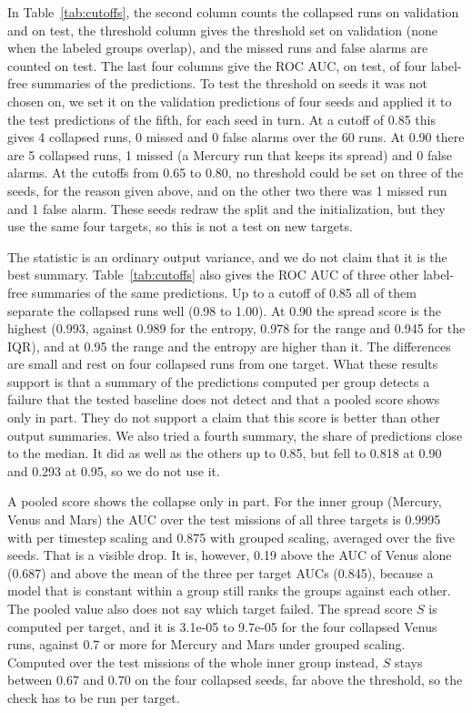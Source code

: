 
In Table~\ref{tab:cutoffs}, the second column counts the collapsed runs on validation and on test, the threshold column gives the threshold set on validation (none when the labeled groups overlap), and the missed runs and false alarms are counted on test. The last four columns give the ROC AUC, on test, of four label-free summaries of the predictions. To test the threshold on seeds it was not chosen on, we set it on the validation predictions of four seeds and applied it to the test predictions of the fifth, for each seed in turn. At a cutoff of 0.85 this gives 4 collapsed runs, 0 missed and 0 false alarms over the 60 runs. At 0.90 there are 5 collapsed runs, 1 missed (a Mercury run that keeps its spread) and 0 false alarms. At the cutoffs from 0.65 to 0.80, no threshold could be set on three of the seeds, for the reason given above, and on the other two there was 1 missed run and 1 false alarm. These seeds redraw the split and the initialization, but they use the same four targets, so this is not a test on new targets.

The statistic is an ordinary output variance, and we do not claim that it is the best summary. Table~\ref{tab:cutoffs} also gives the ROC AUC of three other label-free summaries of the same predictions. Up to a cutoff of 0.85 all of them separate the collapsed runs well (0.98 to 1.00). At 0.90 the spread score is the highest (0.993, against 0.989 for the entropy, 0.978 for the range and 0.945 for the IQR), and at 0.95 the range and the entropy are higher than it. The differences are small and rest on four collapsed runs from one target. What these results support is that a summary of the predictions computed per group detects a failure that the tested baseline does not detect and that a pooled score shows only in part. They do not support a claim that this score is better than other output summaries. We also tried a fourth summary, the share of predictions close to the median. It did as well as the others up to 0.85, but fell to 0.818 at 0.90 and 0.293 at 0.95, so we do not use it.

A pooled score shows the collapse only in part. For the inner group (Mercury, Venus and Mars) the AUC over the test missions of all three targets is 0.9995 with per timestep scaling and 0.875 with grouped scaling, averaged over the five seeds. That is a visible drop. It is, however, 0.19 above the AUC of Venus alone (0.687) and above the mean of the three per target AUCs (0.845), because a model that is constant within a group still ranks the groups against each other. The pooled value also does not say which target failed. The spread score $S$ is computed per target, and it is 3.1e-05 to 9.7e-05 for the four collapsed Venus runs, against 0.7 or more for Mercury and Mars under grouped scaling. Computed over the test missions of the whole inner group instead, $S$ stays between 0.67 and 0.70 on the four collapsed seeds, far above the threshold, so the check has to be run per target.

